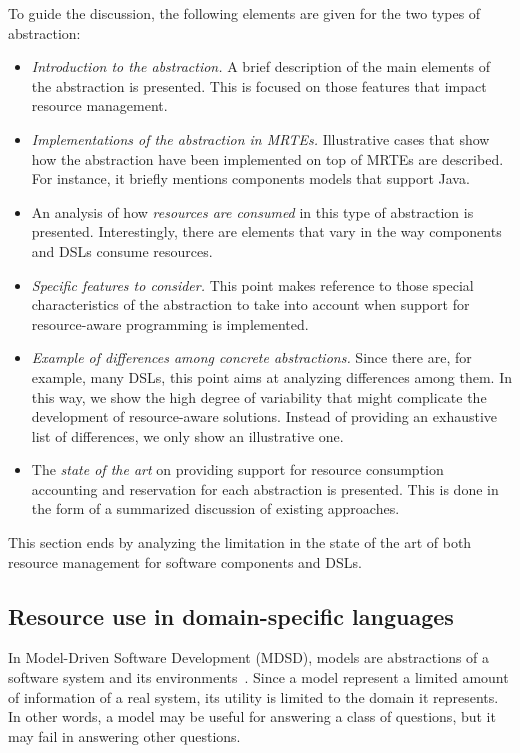To guide the discussion, the following elements are given for the two types of abstraction:
\begin{itemize}
\item \textit{Introduction to the abstraction.} A brief description of the main elements of the abstraction is presented. This is focused on those features that impact resource management. 

\item \textit{Implementations of the abstraction in MRTEs.}
Illustrative cases that show how the abstraction have been implemented on top of MRTEs are described.
For instance, it briefly mentions components models that support Java.

\item An analysis of how \textit{resources are consumed} in this type of abstraction is presented.
Interestingly, there are elements that vary in the way components and DSLs consume resources.

\item \textit{Specific features to consider.}
This point makes reference to those special characteristics of the abstraction to take into account when support for resource-aware programming is implemented.     

\item \textit{Example of differences among concrete abstractions.}
Since there are, for example, many DSLs, this point aims at analyzing differences among them.
In this way, we show the high degree of variability that might complicate the development of resource-aware solutions.
Instead of providing an exhaustive list of differences, we only show an illustrative one.

\item The \textit{state of the art} on providing support for resource consumption accounting and reservation for each abstraction is presented.
This is done in the form of a summarized discussion of existing approaches. 
\end{itemize}

This section ends by analyzing the limitation in the state of the art of both resource management for software components and DSLs. 


\subsection{Resource use in domain-specific languages} \label{sec:DSL-on-MRTEs}

In Model-Driven Software Development (MDSD), models are abstractions of a software system and its environments~\cite{Stahl:2006:MSD:1196766, Fowler:2010:DSL:1809745}.
Since a model represent a limited amount of information of a real system, its utility is limited to the domain it represents.
In other words, a model may be useful for answering a class of questions, but it may fail in answering other questions.

